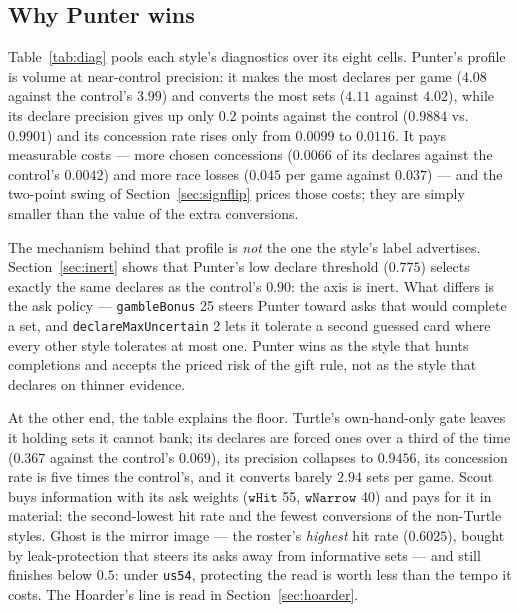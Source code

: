 \documentclass[11pt]{article}
\newcommand{\code}[1]{\texttt{#1}}
\newcommand{\usff}{\code{us54}}
\begin{document}
\subsection{Why Punter wins}
\label{sec:why}

Table~\ref{tab:diag} pools each style's diagnostics over its eight cells. Punter's profile is
volume at near-control precision: it makes the most declares per game ($4.08$ against the
control's $3.99$) and converts the most sets ($4.11$ against $4.02$), while its declare
precision gives up only $0.2$ points against the control ($0.9884$ vs.\ $0.9901$) and its
concession rate rises only from $0.0099$ to $0.0116$. It pays measurable costs --- more chosen
concessions ($0.0066$ of its declares against the control's $0.0042$) and more race losses
($0.045$ per game against $0.037$) --- and the two-point swing of
Section~\ref{sec:signflip} prices those costs; they are simply smaller than the value of the
extra conversions.

The mechanism behind that profile is \emph{not} the one the style's label advertises.
Section~\ref{sec:inert} shows that Punter's low declare threshold ($0.775$) selects exactly
the same declares as the control's $0.90$: the axis is inert. What differs is the ask policy
--- \code{gambleBonus} 25 steers Punter toward asks that would complete a set, and
\code{declareMaxUncertain} 2 lets it tolerate a second guessed card where every other style
tolerates at most one. Punter wins as the style that hunts completions and accepts the
priced risk of the gift rule, not as the style that declares on thinner evidence.

At the other end, the table explains the floor. Turtle's own-hand-only gate leaves it holding
sets it cannot bank; its declares are forced ones over a third of the time ($0.367$ against
the control's $0.069$), its precision collapses to $0.9456$, its concession rate is five times
the control's, and it converts barely $2.94$ sets per game. Scout buys information with its
ask weights ($\code{wHit}$ 55, $\code{wNarrow}$ 40) and pays for it in material: the
second-lowest hit rate and the fewest conversions of the non-Turtle styles. Ghost is the
mirror image --- the roster's \emph{highest} hit rate ($0.6025$), bought by leak-protection
that steers its asks away from informative sets --- and still finishes below $0.5$: under
\usff{}, protecting the read is worth less than the tempo it costs. The Hoarder's line is
read in Section~\ref{sec:hoarder}.
\end{document}
